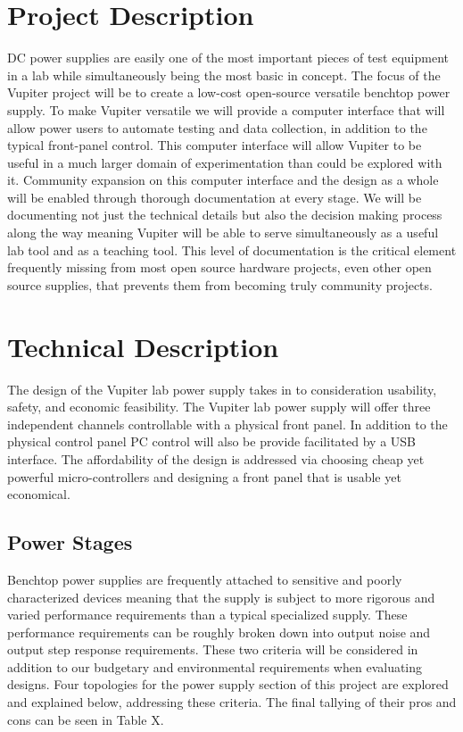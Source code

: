 \documentclass{article}
\begin{document}
\section{Project Description}
\par
DC power supplies are easily one of the most important pieces of test equipment 
in a lab while simultaneously being the most basic in concept. The focus of the 
Vupiter project will be to create a low-cost open-source versatile benchtop power 
supply. To make Vupiter versatile we will provide a computer interface that will 
allow power users to automate testing and data collection, in addition to the 
typical front-panel control. This computer interface will allow Vupiter to be 
useful in a much larger domain of experimentation than could be explored with it. 
Community expansion on this computer interface and the design as a whole will be 
enabled through thorough documentation at every stage. We will be documenting not 
just the technical details but also the decision making process along the way meaning 
Vupiter will be able to serve simultaneously as a useful lab tool and as a teaching 
tool. This level of documentation is the critical element frequently missing from most 
open source hardware projects, even other open source supplies, that prevents them 
from becoming truly community projects.
\section{Technical Description}
The design of the Vupiter lab power supply takes in to consideration usability, 
safety, and economic feasibility.  The Vupiter lab power supply will offer 
three independent channels controllable with a physical front panel. In addition 
to the physical control panel PC control will also be provide facilitated by a 
USB interface. The affordability of the design is addressed via choosing cheap 
yet powerful micro-controllers and designing a front panel that is usable yet 
economical.

\subsection{Power Stages}
Benchtop power supplies are frequently attached to sensitive and poorly 
characterized devices meaning that the supply is subject to more rigorous 
and varied performance requirements than a typical specialized supply. 
These performance requirements can be roughly broken down into output noise 
and output step response requirements. These two criteria will be considered 
in addition to our budgetary and environmental requirements when evaluating 
designs. Four topologies for the power supply section of this project are 
explored and explained below, addressing these criteria. The final tallying 
of their pros and cons can be seen in Table X.
\end{document}
